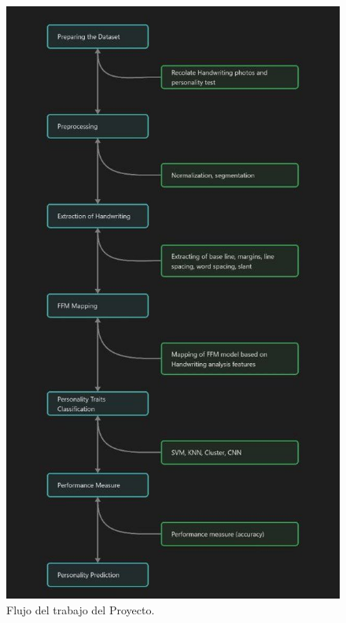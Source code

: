 \documentclass[10pt, a4paper]{article}
\begin{document}
        \begin{figure}[!h]
            \centering
            \includegraphics[width = 0.5\linewidth]{photo_2023-05-29_02-40-00.jpg}
            \caption{Flujo del trabajo del Proyecto.}
        \end{figure}
\end{document}
